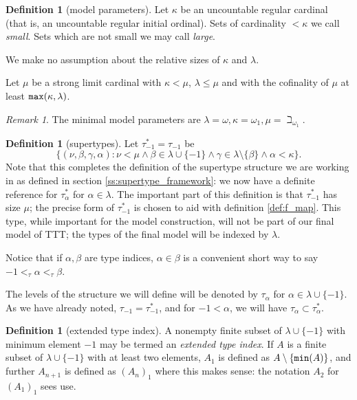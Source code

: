 \documentclass{article}
\theoremstyle{definition}
\newtheorem{definition}[theorem]{Definition}
\theoremstyle{remark}
\newtheorem{remark}[theorem]{Remark}
\begin{document}
{\begin{definition}[model parameters]
Let $\kappa$ be an uncountable regular cardinal (that is, an uncountable  regular initial ordinal).  Sets of cardinality $<\kappa$ we call {\em small\/}.  Sets which are not small we may call {\em large\/}.

We make no assumption about the relative sizes of $\kappa$ and $\lambda$.

Let $\mu$ be a strong limit cardinal with $\kappa<\mu$, $\lambda \leq \mu$ and with the cofinality of $\mu$ at least ${\tt max}(\kappa,\lambda)$.
\end{definition}
\begin{remark}\label{rk:example_model_params}
The minimal model parameters are $\lambda = \omega, \kappa = \omega_1, \mu = \beth_{\omega_1}$.
\end{remark}

\begin{definition}[supertypes]\label{def:supertypes}
Let $\tau^*_{-1}=\tau_{-1}$ be $$\{(\nu,\beta,\gamma,\alpha):\nu<\mu \wedge  \beta \in \lambda\cup \{-1\} \wedge \gamma \in \lambda \setminus \{\beta\}\wedge \alpha<\kappa\}.$$  Note that this completes the definition of the supertype structure we are working in as defined in section \ref{ss:supertype_framework}:  we now have a definite reference
for $\tau^*_\alpha$ for $\alpha\in \lambda$.
The important part of this definition is that $\tau_{-1}^*$ has size $\mu$; the precise form of $\tau_{-1}^*$ is chosen to aid with definition \ref{def:f_map}. This type, while important for the model construction, will not be part of our final model of TTT; the types of the final model  will be indexed by $\lambda$.
\end{definition}

Notice that if $\alpha,\beta$ are type indices, $\alpha\in \beta$ is a convenient short way to say $-1 <_\tau \alpha <_\tau \beta$.

The levels of the structure we will define will be denoted by $\tau_\alpha$ for \newline $\alpha \in \lambda \cup \{-1\}$.  As we have already noted, $\tau_{-1}=\tau^*_{-1}$, and for $-1 < \alpha$, we will have $\tau_\alpha \subset \tau^*_\alpha$.

\begin{definition}[extended type index]\label{def:extended_type_index}
A nonempty finite subset of $\lambda \cup \{-1\}$ {with minimum element $-1$} may be termed an {\em extended type index}.  If $A$ is a finite subset of $\lambda\cup \{-1\}$  with at least two elements, $A_1$ is defined as $A \setminus \{{\tt min}(A)\}$, and further $A_{n+1}$ is defined as $(A_n)_1$ where this makes sense:  the notation $A_2$ for $(A_1)_1$ sees use.
\end{definition}

}
\end{document}
